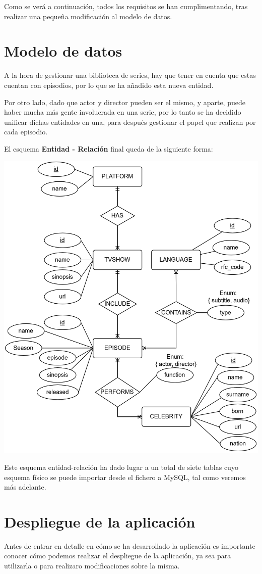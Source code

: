 \documentclass{\ClassPath/viu-tfm-template}
\begin{document}
Como se verá a continuación, todos los requisitos se han cumplimentando, tras realizar una pequeña modificación al modelo de datos.

\chapter{Modelo de datos}
A la hora de gestionar una biblioteca de series, hay que tener en cuenta que estas cuentan con episodios, por lo que se ha añadido esta nueva entidad.

Por otro lado, dado que actor y director pueden ser el mismo, y aparte, puede haber mucha más gente involucrada en una serie, por lo tanto se ha decidido unificar dichas entidades en una, para después gestionar el papel que realizan por cada episodio.

El esquema \textbf{Entidad - Relación} final queda de la siguiente forma:

\begin{center}
    \includegraphics[width=0.8\linewidth]{img/entidad-relacion.png}
\end{center}


Este esquema entidad-relación ha dado lugar a un total de siete tablas cuyo esquema físico se puede importar desde el fichero  a MySQL, tal como veremos más adelante.

\chapter{Despliegue de la aplicación}
Antes de entrar en detalle en cómo se ha desarrollado la aplicación es importante conocer cómo podemos realizar el despliegue de la aplicación, ya sea para utilizarla o para realizaro modificaciones sobre la misma.
\end{document}
